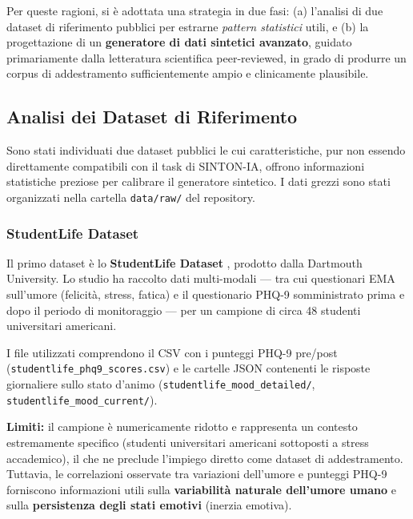 Per queste ragioni, si è adottata una strategia in due fasi: (a) l'analisi di due dataset di riferimento pubblici per estrarne \textit{pattern statistici} utili, e (b) la progettazione di un \textbf{generatore di dati sintetici avanzato}, guidato primariamente dalla letteratura scientifica peer-reviewed, in grado di produrre un corpus di addestramento sufficientemente ampio e clinicamente plausibile.

\subsection{Analisi dei Dataset di Riferimento}
\label{subsec:analisi_dataset_depression}

Sono stati individuati due dataset pubblici le cui caratteristiche, pur non essendo direttamente compatibili con il task di SINTON-IA, offrono informazioni statistiche preziose per calibrare il generatore sintetico. I dati grezzi sono stati organizzati nella cartella \texttt{data/raw/} del repository.

\subsubsection{StudentLife Dataset}

Il primo dataset è lo \textbf{StudentLife Dataset} \cite{studentlife_dataset}, prodotto dalla Dartmouth University. Lo studio ha raccolto dati multi-modali --- tra cui questionari EMA sull'umore (felicità, stress, fatica) e il questionario PHQ-9 somministrato prima e dopo il periodo di monitoraggio --- per un campione di circa 48 studenti universitari americani.

I file utilizzati comprendono il CSV con i punteggi PHQ-9 pre/post (\texttt{studentlife\_\allowbreak{}phq9\_\allowbreak{}scores.csv}) e le cartelle JSON contenenti le risposte giornaliere sullo stato d'animo (\texttt{studentlife\_\allowbreak{}mood\_\allowbreak{}detailed/}, \texttt{studentlife\_\allowbreak{}mood\_\allowbreak{}current/}).

\textbf{Limiti:} il campione è numericamente ridotto e rappresenta un contesto estremamente specifico (studenti universitari americani sottoposti a stress accademico), il che ne preclude l'impiego diretto come dataset di addestramento. Tuttavia, le correlazioni osservate tra variazioni dell'umore e punteggi PHQ-9 forniscono informazioni utili sulla \textbf{variabilità naturale dell'umore umano} e sulla \textbf{persistenza degli stati emotivi} (inerzia emotiva).

